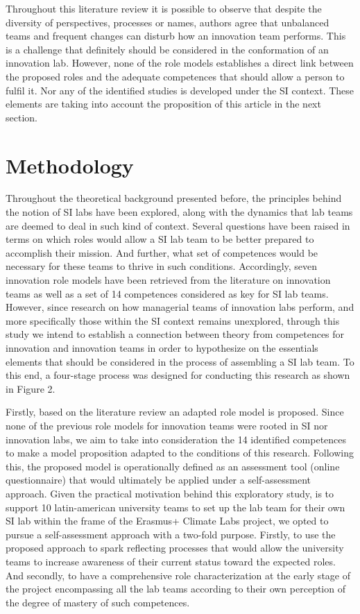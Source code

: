 \documentclass[AMA,STIX1COL,APA,STIX2COL]{WileyNJD-v2}
\begin{document}
Throughout this literature review it is possible to observe that despite
the diversity of perspectives, processes or names, authors agree that
unbalanced teams and frequent changes can disturb how an innovation team
performs. This is a challenge that definitely should be considered in
the conformation of an innovation lab. However, none of the role models
establishes a direct link between the proposed roles and the adequate
competences that should allow a person to fulfil it. Nor any of the
identified studies is developed under the SI context. These elements are
taking into account the proposition of this article in the next section.

\hypertarget{methodology}{%
\section{Methodology}\label{methodology}}

Throughout the theoretical background presented before, the principles
behind the notion of SI labs have been explored, along with the dynamics
that lab teams are deemed to deal in such kind of context. Several
questions have been raised in terms on which roles would allow a SI lab
team to be better prepared to accomplish their mission. And further,
what set of competences would be necessary for these teams to thrive in
such conditions. Accordingly, seven innovation role models have been
retrieved from the literature on innovation teams as well as a set of 14
competences considered as key for SI lab teams. However, since research
on how managerial teams of innovation labs perform, and more
specifically those within the SI context remains unexplored, through
this study we intend to establish a connection between theory from
competences for innovation and innovation teams in order to hypothesize
on the essentials elements that should be considered in the process of
assembling a SI lab team. To this end, a four-stage process was designed
for conducting this research as shown in Figure 2.

Firstly, based on the literature review an adapted role model is
proposed. Since none of the previous role models for innovation teams
were rooted in SI nor innovation labs, we aim to take into consideration
the 14 identified competences to make a model proposition adapted to the
conditions of this research. Following this, the proposed model is
operationally defined as an assessment tool (online questionnaire) that
would ultimately be applied under a self-assessment approach. Given the
practical motivation behind this exploratory study, is to support 10
latin-american university teams to set up the lab team for their own SI
lab within the frame of the Erasmus+ Climate Labs project, we opted to
pursue a self-assessment approach with a two-fold purpose. Firstly, to
use the proposed approach to spark reflecting processes that would allow
the university teams to increase awareness of their current status
toward the expected roles. And secondly, to have a comprehensive role
characterization at the early stage of the project encompassing all the
lab teams according to their own perception of the degree of mastery of
such competences.
\end{document}

